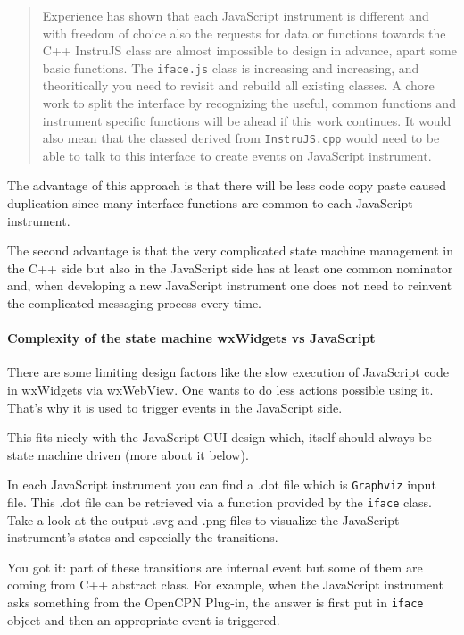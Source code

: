 \documentclass[11pt]{article}
\begin{document}
    \begin{quote}
Experience has shown that each JavaScript instrument is different and
with freedom of choice also the requests for data or functions towards
the C++ InstruJS class are almost impossible to design in advance, apart
some basic functions. The \texttt{iface.js} class is increasing and
increasing, and theoritically you need to revisit and rebuild all
existing classes. A chore work to split the interface by recognizing the
useful, common functions and instrument specific functions will be ahead
if this work continues. It would also mean that the classed derived from
\texttt{InstruJS.cpp} would need to be able to talk to this interface to
create events on JavaScript instrument.
\end{quote}

    The advantage of this approach is that there will be less code copy
paste caused duplication since many interface functions are common to
each JavaScript instrument.

    The second advantage is that the very complicated state machine
management in the C++ side but also in the JavaScript side has at least
one common nominator and, when developing a new JavaScript instrument
one does not need to reinvent the complicated messaging process every
time.

    \hypertarget{complexity-of-the-state-machine-wxwidgets-vs-javascript}{%
\paragraph{Complexity of the state machine wxWidgets vs
JavaScript}\label{complexity-of-the-state-machine-wxwidgets-vs-javascript}}

    There are some limiting design factors like the slow execution of
JavaScript code in wxWidgets via wxWebView. One wants to do less actions
possible using it. That's why it is used to trigger events in the
JavaScript side.

    This fits nicely with the JavaScript GUI design which, itself should
always be state machine driven (more about it below).

    In each JavaScript instrument you can find a .dot file which is
\texttt{Graphviz} input file. This .dot file can be retrieved via a
function provided by the \texttt{iface} class. Take a look at the output
.svg and .png files to visualize the JavaScript instrument's states and
especially the transitions.

    You got it: part of these transitions are internal event but some of
them are coming from C++ abstract class. For example, when the
JavaScript instrument asks something from the OpenCPN Plug-in, the
answer is first put in \texttt{iface} object and then an appropriate
event is triggered.
\end{document}
